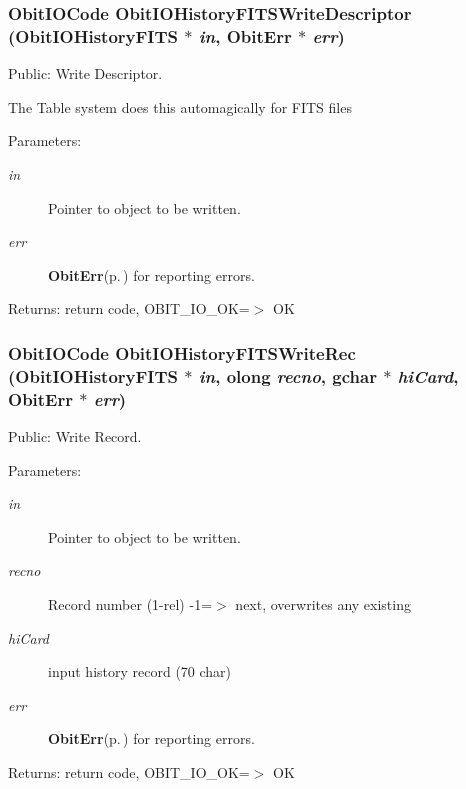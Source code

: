 \subsubsection{\setlength{\rightskip}{0pt plus 5cm}Obit\-IOCode Obit\-IOHistory\-FITSWrite\-Descriptor ({\bf Obit\-IOHistory\-FITS} $\ast$ {\em in}, {\bf Obit\-Err} $\ast$ {\em err})}\label{ObitIOHistoryFITS_8h_a18}


Public: Write Descriptor. 

The Table system does this automagically for FITS files \begin{Desc}
\item[Parameters:]
\begin{description}
\item[{\em in}]Pointer to object to be written. \item[{\em err}]{\bf Obit\-Err}{\rm (p.\,\pageref{structObitErr})} for reporting errors. \end{description}
\end{Desc}
\begin{Desc}
\item[Returns:]return code, OBIT\_\-IO\_\-OK=$>$ OK \end{Desc}
\subsubsection{\setlength{\rightskip}{0pt plus 5cm}Obit\-IOCode Obit\-IOHistory\-FITSWrite\-Rec ({\bf Obit\-IOHistory\-FITS} $\ast$ {\em in}, {\bf olong} {\em recno}, gchar $\ast$ {\em hi\-Card}, {\bf Obit\-Err} $\ast$ {\em err})}\label{ObitIOHistoryFITS_8h_a15}


Public: Write Record. 

\begin{Desc}
\item[Parameters:]
\begin{description}
\item[{\em in}]Pointer to object to be written. \item[{\em recno}]Record number (1-rel) -1=$>$ next, overwrites any existing \item[{\em hi\-Card}]input history record (70 char) \item[{\em err}]{\bf Obit\-Err}{\rm (p.\,\pageref{structObitErr})} for reporting errors. \end{description}
\end{Desc}
\begin{Desc}
\item[Returns:]return code, OBIT\_\-IO\_\-OK=$>$ OK \end{Desc}
